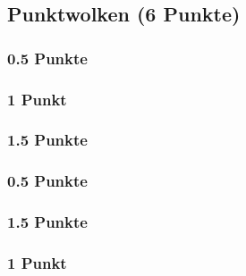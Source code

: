 \newif\ifvimbug
\vimbugfalse

\ifvimbug

\fi


\subsection{Punktwolken (6 Punkte)}
\subsubsection{0.5 Punkte}
\subsubsection{1 Punkt}
\subsubsection{1.5 Punkte}
\subsubsection{0.5 Punkte}
\subsubsection{1.5 Punkte}
\subsubsection{1 Punkt}